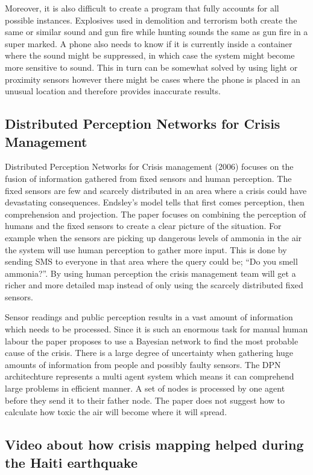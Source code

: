 Moreover, it is also difficult to create a program that fully accounts for all possible instances. Explosives used in demolition and terrorism both create the same or similar sound and gun fire while hunting sounds the same as gun fire in a super marked. A phone also needs to know if it is currently inside a container where the sound might be suppressed, in which case the system might become more sensitive to sound. This in turn can be somewhat solved by using light or proximity sensors however there might be cases where the phone is placed in an unusual location and therefore provides inaccurate results.

\subsection{Distributed Perception Networks for Crisis Management}

Distributed Perception Networks for Crisis management (2006) focuses on the fusion of information gathered from fixed sensors and human perception. The fixed sensors are few and scarcely distributed in an area where a crisis could have devastating consequences. Endsley’s model tells that first comes perception, then comprehension and projection. The paper focuses on combining the perception of humans and the fixed sensors to create a clear picture of the situation. For example when the sensors are picking up dangerous levels of ammonia in the air the system will use human perception to gather more input. This is done by sending SMS to everyone in that area where the query could be; “Do you smell ammonia?”. By using human perception the crisis management team will get a richer and more detailed map instead of only using the scarcely distributed fixed sensors.

Sensor readings and public perception results in a vast amount of information which needs to be processed. Since it is such an enormous task for manual human labour the paper proposes to use a Bayesian network to find the most probable cause of the crisis. There is a large degree of uncertainty when gathering huge amounts of information from people and possibly faulty sensors. The DPN architechture represents a multi agent system which means it can comprehend large problems in efficient manner. A set of nodes is processed by one agent before they send it to their father node. The paper does not suggest how to calculate how toxic the air will become where it will spread.  

\subsection{Video about how crisis mapping helped during the Haiti earthquake}

